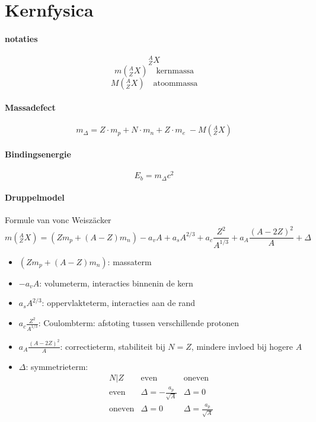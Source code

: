 \newpage
\section{Kernfysica}
\label{sec:kernfys}

\paragraph{notaties}
\[
  ^A_ZX 
\]
\[
  m\left( ^A_ZX \right) \quad \mbox{kernmassa}
\]
\[
  M\left( ^A_ZX \right) \quad \mbox{atoommassa}
\]

\paragraph{Massadefect}
\[
  m_\Delta = Z \cdot m_p + N \cdot m_n + Z \cdot m_e  \; - M\left( ^A_ZX \right)
\]

\paragraph{Bindingsenergie}
\[
  E_b = m_\Delta c^2
\]

\paragraph{Druppelmodel} Formule van vonc Weiszäcker
\[
  m\left( ^A_ZX \right) = \left( Z m_p + (A-Z)m_n \right) -a_v A + a_s A^{2/3} + a_c \frac{Z^2}{A^{1/3}} + a_A \frac{(A-2Z)^2}{A} + \Delta
\]
\begin{itemize}
 \item $\left( Z m_p + (A-Z)m_n \right)$: massaterm
 \item $-a_v A$: volumeterm, interacties binnenin de kern
 \item $a_s A^{2/3}$: oppervlakteterm, interacties aan de rand
 \item $a_c \frac{Z^2}{A^{1/3}}$: Coulombterm: afstoting tussen verschillende protonen
 \item $a_A \frac{(A-2Z)^2}{A}$: correctieterm, stabiliteit bij $N=Z$, mindere invloed bij hogere $A$
 \item $\Delta$: symmetrieterm: 
    \[
    \begin{array}{ccc}
           N | Z    & \mbox{even}                     & \mbox{oneven} \\
      \mbox{even}   & \Delta = - \frac{a_p}{\sqrt{A}} & \Delta = 0 \\
      \mbox{oneven} & \Delta = 0                      & \Delta = \frac{a_p}{\sqrt{A}} 
    \end{array}
    \]
\end{itemize}

